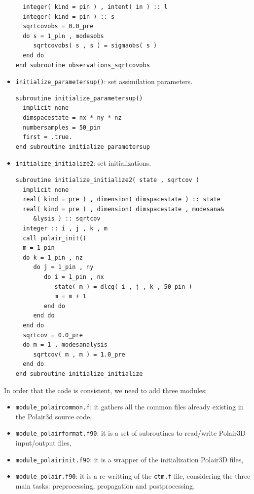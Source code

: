 \documentclass[12pt]{article}
\begin{document}
\begin{itemize}
\begin{verbatim}
  integer( kind = pin ) , intent( in ) :: l
  integer( kind = pin ) :: s
  sqrtcovobs = 0.0_pre
  do s = 1_pin , modesobs
     sqrtcovobs( s , s ) = sigmaobs( s )
  end do
end subroutine observations_sqrtcovobs
\end{verbatim}
\item {\tt initialize\_parametersup()}: set assimilation parameters.
\begin{verbatim}
subroutine initialize_parametersup()
  implicit none
  dimspacestate = nx * ny * nz
  numbersamples = 50_pin
  first = .true.
end subroutine initialize_parametersup
\end{verbatim}
\item {\tt initialize\_initialize2}: set initializations.
\begin{verbatim}
subroutine initialize_initialize2( state , sqrtcov )
  implicit none
  real( kind = pre ) , dimension( dimspacestate ) :: state
  real( kind = pre ) , dimension( dimspacestate , modesana&
     &lysis ) :: sqrtcov
  integer :: i , j , k , m
  call polair_init()
  m = 1_pin
  do k = 1_pin , nz
     do j = 1_pin , ny
        do i = 1_pin , nx
           state( m ) = dlcg( i , j , k , 50_pin )
           m = m + 1
        end do
     end do
  end do
  sqrtcov = 0.0_pre
  do m = 1 , modesanalysis
     sqrtcov( m , m ) = 1.0_pre
  end do
end subroutine initialize_initialize
\end{verbatim}
\end{itemize}

In order that the code is consistent, we need to add three modules: 
\begin{itemize}
\item {\tt module\_polaircommon.f}: it gathers all the common files already existing in the Polair3d source code, 
\item {\tt module\_polairformat.f90}: it is a set of subroutines to read/write Polair3D input/output files,
\item {\tt module\_polairinit.f90}: it is a wrapper of the initialization Polair3D files,
\item {\tt module\_polair.f90}: it is a re-writting of the {\tt ctm.f} file, considering the three main tasks: preprocessing, propagation and postprocessing. 
\end{itemize}
\end{document}
